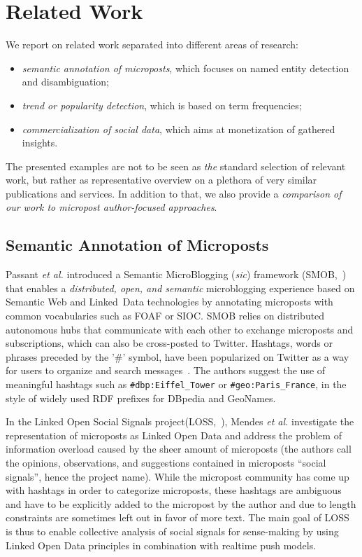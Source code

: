 \documentclass{iosart2c}
\begin{document}
\section{Related Work} \label{sec:relatedwork}
We report on related work separated into different areas of research:
\begin{itemize}
\item \emph{semantic annotation of microposts}, which focuses on named entity detection and disambiguation;
\item \emph{trend or popularity detection}, which is based on term frequencies;
\item \emph{commercialization of social data}, which aims at monetization of gathered insights.
\end{itemize}
The presented examples are not to be seen as \emph{the} standard selection of relevant work, but rather as representative overview on a plethora of very similar publications and services.
In addition to that, we also provide a \emph{comparison of our work to micropost author-focused approaches}.

\subsection{Semantic Annotation of Microposts}
Passant \textit{et al.} introduced a Semantic MicroBlogging (\textit{sic}) framework (SMOB,~\cite{Passant2008}) that enables a \textit{distributed, open, and semantic} microblogging experience based on Semantic Web and Linked~Data technologies by annotating microposts with common vocabularies such as FOAF or SIOC.
SMOB relies on distributed autonomous hubs that communicate with each other to exchange microposts and subscriptions, which can also be cross-posted to Twitter.
Hashtags, words or phrases preceded by the '\#' symbol, have been popularized on Twitter as a way for users to organize and search messages~\cite{hashtag}.
The authors suggest the use of meaningful hashtags such as \texttt{\#dbp:Eiffel\_Tower} or \texttt{\#geo:Paris\_France}, in the style of widely used RDF prefixes for DBpedia and GeoNames.

In the Linked Open Social Signals project\linebreak (LOSS,~\cite{Mendes:LOSS}), Mendes \textit{et al.} investigate the representation of microposts as Linked Open Data and address the problem of information overload caused by the sheer amount of microposts (the authors call the opinions, observations, and suggestions contained in microposts ``social signals'', hence the project name).
While the micropost community has come up with hashtags in order to categorize microposts, these hashtags are ambiguous and have to be explicitly added to the micropost by the author and due to length constraints are sometimes left out in favor of more text.
The main goal of LOSS is thus to enable collective analysis of social signals for sense-making by using Linked Open Data principles in combination with realtime push models.
\end{document}
